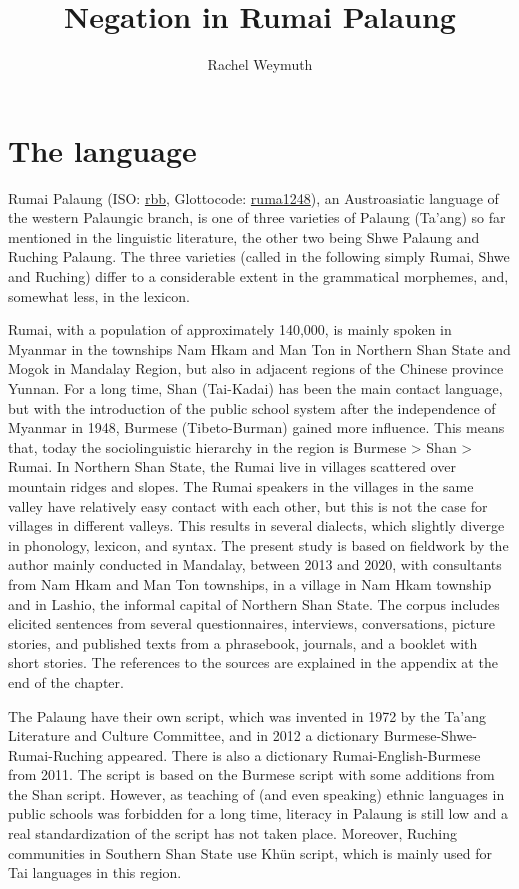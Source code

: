 \documentclass[output=paper,colorlinks,citecolor=brown]{langscibook}
\author{Rachel Weymuth\affiliation{}}
\title{Negation in Rumai Palaung}
\begin{document}
\maketitle 

\section{The language} \label{sec:rum:1}

Rumai Palaung (ISO: \href{https://iso639-3.sil.org/code/rbb}{rbb}, Glottocode: \href{https://glottolog.org/resource/languoid/id/ruma1248}{ruma1248}), an Austroasiatic language of the western Palaungic branch, is one of three varieties of Palaung (Ta’ang) so far mentioned in the linguistic literature, the other two being Shwe Palaung and Ruching Palaung. The three varieties (called in the following simply Rumai, Shwe and Ruching) differ to a considerable extent in the grammatical morphemes, and, somewhat less, in the lexicon.

Rumai, with a population of approximately 140,000, is mainly spoken in Myanmar in the townships Nam Hkam and Man Ton in Northern Shan State and Mogok in Mandalay Region, but also in adjacent regions of the Chinese province Yunnan. For a long time, Shan (Tai-Kadai) has been the main contact language, but with the introduction of the public school system after the independence of Myanmar in 1948, Burmese (Tibeto-Burman) gained more influence. This means that, today the sociolinguistic hierarchy in the region is Burmese > Shan > Rumai. In Northern Shan State, the Rumai live in villages scattered over mountain ridges and slopes. The Rumai speakers in the villages in the same valley have relatively easy contact with each other, but this is not the case for villages in different valleys. This results in several dialects, which slightly diverge in phonology, lexicon, and syntax. The present study is based on fieldwork by the author mainly conducted in Mandalay, between 2013 and 2020, with consultants from Nam Hkam and Man Ton townships, in a village in Nam Hkam township and in Lashio, the informal capital of Northern Shan State. The corpus includes elicited sentences from several questionnaires, interviews, conversations, picture stories, and published texts from a phrasebook, journals, and a booklet with short stories. The references to the sources are explained in the appendix at the end of the chapter.

The Palaung have their own script, which was invented in 1972 by the Ta’ang Literature and Culture Committee, and in 2012 a dictionary Burmese-Shwe-Rumai-Ruching appeared. There is also a dictionary Rumai-English-Burmese from 2011. The script is based on the Burmese script with some additions from the Shan script. However, as teaching of (and even speaking) ethnic languages in public schools was forbidden for a long time, literacy in Palaung is still low and a real standardization of the script has not taken place. Moreover, Ruching communities in Southern Shan State use Khün script, which is mainly used for Tai languages in this region.
\end{document}
